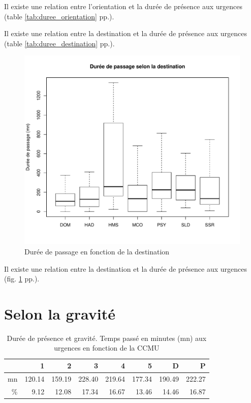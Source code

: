 \documentclass[12pt,english,french,twoside]{book}\usepackage[]{graphicx}\usepackage[]{color}
\makeatletter
\def\maxwidth{ %
  \ifdim\Gin@nat@width>\linewidth
    \linewidth
  \else
    \Gin@nat@width
  \fi
}
\newenvironment{knitrout}{}{} %
\makeatother
\begin{document}
Il existe une relation entre l'orientation et la durée de présence aux urgences (table \ref{tab:duree_orientation} pp.\pageref{tab:duree_orientation}).

Il existe une relation entre la destination et la durée de présence aux urgences (table \ref{tab:duree_destination} pp.\pageref{tab:duree_destination}).

\begin{figure}[ht!]
 \centering
\begin{knitrout}
\color{fgcolor}
\includegraphics[width=\maxwidth]{figure/bp_duree_dest} 

\end{knitrout}

 \caption{Durée de passage en fonction de la destination}
 \label{duree_dest}
\end{figure}
Il existe une relation entre la destination et la durée de présence aux urgences (fig. \ref{duree_dest} pp.\pageref{duree_dest}).


\section{Selon la gravité}

\begin{table}[ht]
\centering
\begin{tabular}{rrrrrrrr}
  \hline
 & 1 & 2 & 3 & 4 & 5 & D & P \\ 
  \hline
mn & 120.14 & 159.19 & 228.40 & 219.64 & 177.34 & 190.49 & 222.27 \\ 
  \% & 9.12 & 12.08 & 17.34 & 16.67 & 13.46 & 14.46 & 16.87 \\ 
   \hline
\end{tabular}
\caption[Durée de présence et gravité]{Durée de présence et gravité. Temps passé en minutes (mn) aux urgences en fonction de la CCMU} 
\label{duree_gravite}
\end{table}
\end{document}
